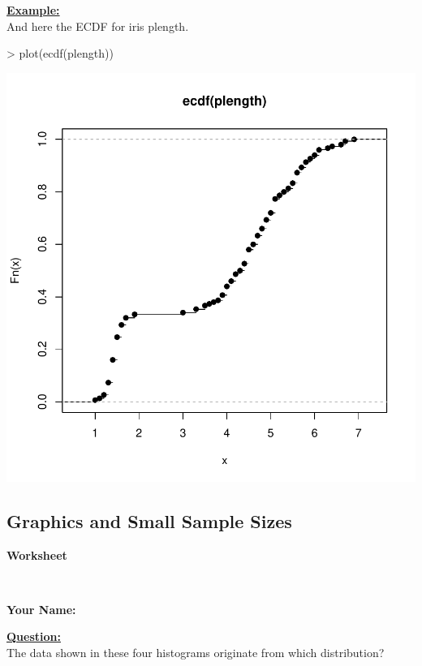 \documentclass[12pt,letterpaper,final]{article}
\begin{document}
\noindent
\underline{\bf Example:} \\
And here the ECDF for iris plength.

\begin{Schunk}
\begin{Sinput}
> plot(ecdf(plength)) 
\end{Sinput}
\end{Schunk}
\includegraphics{lect_main-037}


\newpage


\subsection{Graphics and Small Sample Sizes}


\centerline{\Large \bf Worksheet}~\\

\centerline{\hfill {\large \bf Your Name:} \underline{\hspace*{5cm}}}


\underline{\bf Question:} \\

The data shown in these four histograms originate from which 
distribution?

\end{document}
